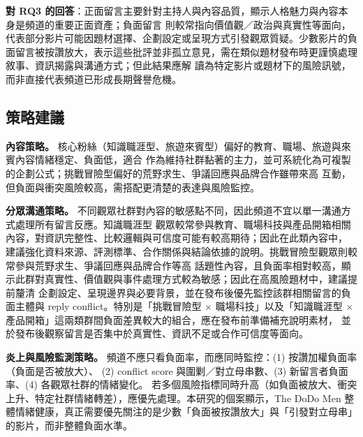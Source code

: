 \textbf{對 RQ3 的回答}：正面留言主要針對主持人與內容品質，顯示人格魅力與內容本身是頻道的重要正面資產；負面留言
則較常指向價值觀／政治與真實性等面向，代表部分影片可能因題材選擇、企劃設定或呈現方式引發觀眾質疑。少數影片的負
面留言被按讚放大，表示這些批評並非孤立意見，需在類似題材發布時更謹慎處理敘事、資訊揭露與溝通方式；但此結果應解
讀為特定影片或題材下的風險訊號，而非直接代表頻道已形成長期聲譽危機。

\subsection{策略建議}
\label{sec:case-strategy}

\textbf{內容策略。} 核心粉絲（知識職涯型、旅遊來賓型）偏好的教育、職場、旅遊與來賓內容情緒穩定、負面低，適合
作為維持社群黏著的主力，並可系統化為可複製的企劃公式；挑戰冒險型偏好的荒野求生、爭議回應與品牌合作雖帶來高
互動，但負面與衝突風險較高，需搭配更清楚的表達與風險監控。

\textbf{分眾溝通策略。} 不同觀眾社群對內容的敏感點不同，因此頻道不宜以單一溝通方式處理所有留言反應。知識職涯型
觀眾較常參與教育、職場科技與產品開箱相關內容，對資訊完整性、比較邏輯與可信度可能有較高期待；因此在此類內容中，
建議強化資料來源、評測標準、合作關係與結論依據的說明。挑戰冒險型觀眾則較常參與荒野求生、爭議回應與品牌合作等高
話題性內容，且負面率相對較高，顯示此群對真實性、價值觀與事件處理方式較為敏感；因此在高風險題材中，建議提前釐清
企劃設定、呈現邊界與必要背景，並在發布後優先監控該群相關留言的負面主體與 reply conflict。特別是「挑戰冒險型
$\times$ 職場科技」以及「知識職涯型 $\times$ 產品開箱」這兩類群間負面差異較大的組合，應在發布前準備補充說明素材，
並於發布後觀察留言是否集中於真實性、資訊不足或合作可信度等面向。

\textbf{炎上與風險監測策略。} 頻道不應只看負面率，而應同時監控：(1) 按讚加權負面率（負面是否被放大）、
(2) conflict score 與圍剿／對立母串數、(3) 新留言者負面率、(4) 各觀眾社群的情緒變化。
若多個風險指標同時升高（如負面被放大、衝突上升、特定社群情緒轉差），應優先處理。本研究的個案顯示，The DoDo Men
整體情緒健康，真正需要優先關注的是少數「負面被按讚放大」與「引發對立母串」的影片，而非整體負面水準。
